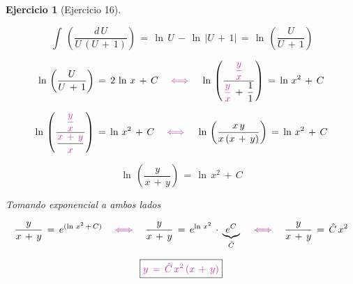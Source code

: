 \documentclass[a4paper,11pt]{book}
\newtheorem{ejer}{Ejercicio}[section]
\begin{document}
\begin{ejer}[Ejercicio 16]
\begin{tcolorbox}[colback=red!5!white,colframe=red!75!black,fonttitle=\bfseries,title=$I_{1}$]
$$\displaystyle\,\int\,\left(\dfrac{d\,U}{U\,(U\,+\,1)} \right)\,=\,\ln\,U\,-\,\ln\,|U\,+\,1|\,=\,\boxed{\ln\,\left(\dfrac{U}{U\,+\,1} \right)}$$ 

  

\end{tcolorbox}  

  

 $$\ln\,\left(\dfrac{U}{U\,+\,1} \right)\,=\,2\,\ln\,x\,+\,C \quad \textcolor{byzantine}{\iff} \quad \ln\,\left(\dfrac{\textcolor{byzantine}{\dfrac{y}{x}}}{\textcolor{byzantine}{\dfrac{y}{x}}\,+\,\dfrac{1}{1} } \right)\,=\,\ln\,x^{2}\,+\,C$$ 

  

$$\ln\,\left(\dfrac{\textcolor{byzantine}{\dfrac{y}{x}}}{\dfrac{\textcolor{byzantine}{x\,+\,y} }{\textcolor{byzantine}{x}} } \right)\,=\,\ln\,x^{2}\,+\,C \quad \textcolor{byzantine}{\iff} \quad \ln\,\left(\dfrac{x\,y}{x\,(x\,+\,y)} \right)\,=\,\ln\,x^{2}\,+\,C$$ 

  

$$\ln\,\left(\dfrac{y}{x\,+\,y} \right)\,=\,\ln\,x^{2}\,+\,C $$ 

  

Tomando exponencial a ambos lados 

  

 $$\dfrac{y}{x\,+\,y}\,=\,e^{(\ln\,x^{2}\,+\,C)} \quad \textcolor{byzantine}{\iff} \quad \dfrac{y}{x\,+\,y}\,=\,e^{\ln\,x^{2} }\,\cdot\,\underbrace{e^{C}}_{\hat{C}} \quad \textcolor{byzantine}{\iff} \quad \dfrac{y}{x\,+\,y}\,=\,\hat{C}\, x^{2}$$ 

  

$$\boxed{\textcolor{byzantine}{y\,=\,\hat{C}\, x^{2}\,(x\,+\,y) } } $$ 

  



\end{ejer} 

  
\end{document}
